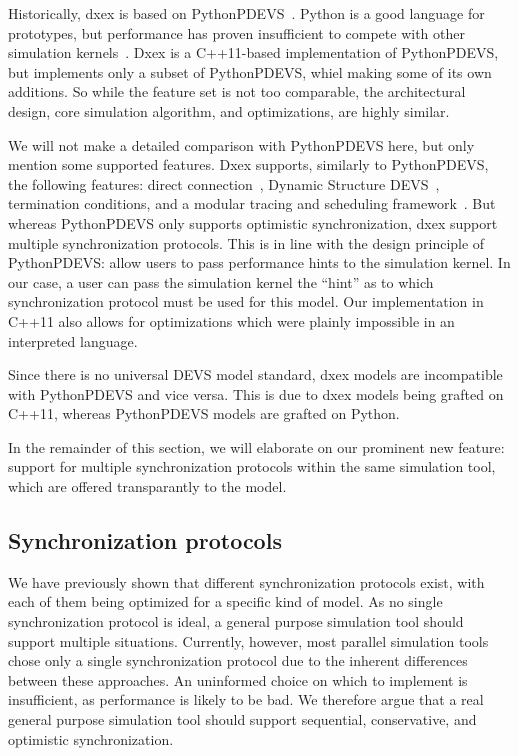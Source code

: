 Historically, dxex is based on PythonPDEVS~\cite{PythonPDEVS}.
Python is a good language for prototypes, but performance has proven insufficient to compete with other simulation kernels~\cite{MasterThesis}.
Dxex is a C++11-based implementation of PythonPDEVS, but implements only a subset of PythonPDEVS, whiel making some of its own additions.
So while the feature set is not too comparable, the architectural design, core simulation algorithm, and optimizations, are highly similar.

We will not make a detailed comparison with PythonPDEVS here, but only mention some supported features.
Dxex supports, similarly to PythonPDEVS, the following features: direct connection~\cite{SymbolicFlattening}, \textsf{Dynamic Structure DEVS}~\cite{DSDEVS}, termination conditions, and a modular tracing and scheduling framework~\cite{PythonPDEVS}.
But whereas PythonPDEVS only supports optimistic synchronization, dxex support multiple synchronization protocols.
This is in line with the design principle of PythonPDEVS: allow users to pass performance hints to the simulation kernel.
In our case, a user can pass the simulation kernel the ``hint'' as to which synchronization protocol must be used for this model.
Our implementation in C++11 also allows for optimizations which were plainly impossible in an interpreted language.

Since there is no universal \textsf{DEVS} model standard, dxex models are incompatible with PythonPDEVS and vice versa.
This is due to dxex models being grafted on C++11, whereas PythonPDEVS models are grafted on Python.

In the remainder of this section, we will elaborate on our prominent new feature: support for multiple synchronization protocols within the same simulation tool, which are offered transparantly to the model.

\subsection{Synchronization protocols}
We have previously shown that different synchronization protocols exist, with each of them being optimized for a specific kind of model.
As no single synchronization protocol is ideal, a general purpose simulation tool should support multiple situations.
Currently, however, most parallel simulation tools chose only a single synchronization protocol due to the inherent differences between these approaches.
An uninformed choice on which to implement is insufficient, as performance is likely to be bad.
We therefore argue that a real general purpose simulation tool should support sequential, conservative, and optimistic synchronization.

